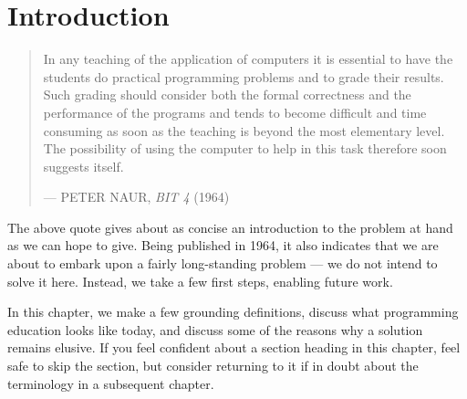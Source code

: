 
\chapter{Introduction}

\begin{quotation}

\footnotesize\sffamily\itshape

\begin{flushright}

In any teaching of the application of computers it is essential to have the
students do practical programming problems and to grade their results. Such
grading should consider both the formal correctness and the performance of the
programs and tends to become difficult and time consuming as soon as the
teaching is beyond the most elementary level.  The possibility of using the
computer to help in this task therefore soon suggests itself.

\smallbreak

\upshape

--- PETER NAUR, {\itshape BIT 4} (1964)

\end{flushright}

\end{quotation}

The above quote gives about as concise an introduction to the problem at hand
as we can hope to give. Being published in 1964, it also indicates that we are
about to embark upon a fairly long-standing problem --- we do not intend to
solve it here. Instead, we take a few first steps, enabling future work.

In this chapter, we make a few grounding definitions, discuss what programming
education looks like today, and discuss some of the reasons why a solution
remains elusive. If you feel confident about a section heading in this chapter,
feel safe to skip the section, but consider returning to it if in doubt about
the terminology in a subsequent chapter.








